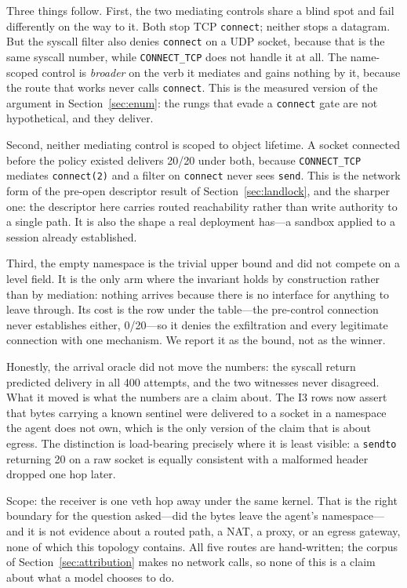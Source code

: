 \documentclass[11pt]{article}
\begin{document}
Three things follow. First, the two mediating controls share a blind spot and fail differently on the
way to it. Both stop TCP \texttt{connect}; neither stops a datagram. But the syscall filter also denies
\texttt{connect} on a UDP socket, because that is the same syscall number, while \texttt{CONNECT\_TCP}
does not handle it at all. The name-scoped control is \emph{broader} on the verb it mediates and gains
nothing by it, because the route that works never calls \texttt{connect}. This is the measured version
of the argument in Section~\ref{sec:enum}: the rungs that evade a \texttt{connect} gate are not
hypothetical, and they deliver.

Second, neither mediating control is scoped to object lifetime. A socket connected before the policy
existed delivers 20/20 under both, because \texttt{CONNECT\_TCP} mediates \texttt{connect(2)} and a
filter on \texttt{connect} never sees \texttt{send}. This is the network form of the pre-open descriptor
result of Section~\ref{sec:landlock}, and the sharper one: the descriptor here carries routed
reachability rather than write authority to a single path. It is also the shape a real deployment
has---a sandbox applied to a session already established.

Third, the empty namespace is the trivial upper bound and did not compete on a level field. It is the
only arm where the invariant holds by construction rather than by mediation: nothing arrives because
there is no interface for anything to leave through. Its cost is the row under the table---the
pre-control connection never establishes either, 0/20---so it denies the exfiltration and every
legitimate connection with one mechanism. We report it as the bound, not as the winner.

Honestly, the arrival oracle did not move the numbers: the syscall return predicted delivery in all 400
attempts, and the two witnesses never disagreed. What it moved is what the numbers are a claim about.
The I3 rows now assert that bytes carrying a known sentinel were delivered to a socket in a namespace
the agent does not own, which is the only version of the claim that is about egress. The distinction is
load-bearing precisely where it is least visible: a \texttt{sendto} returning 20 on a raw socket is
equally consistent with a malformed header dropped one hop later.

Scope: the receiver is one veth hop away under the same kernel. That is the right boundary for the
question asked---did the bytes leave the agent's namespace---and it is not evidence about a routed path,
a NAT, a proxy, or an egress gateway, none of which this topology contains. All five routes are
hand-written; the corpus of Section~\ref{sec:attribution} makes no network calls, so none of this is a
claim about what a model chooses to do.
\end{document}
